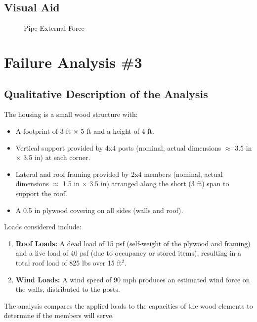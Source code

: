 \documentclass[12pt]{report}
\begin{document}
\subsection{Visual Aid}
\begin{figure}[!ht]
\centering
{}%

\label{fig:inpo_pipe}
\caption{Pipe External Force}
\end{figure}
\newpage
\section{Failure Analysis \#3}

\subsection{Qualitative Description of the Analysis}
The housing is a small wood structure with:
\begin{itemize}
    \item A footprint of 3 ft $\times$ 5 ft and a height of 4 ft.
    \item Vertical support provided by 4x4 posts (nominal, actual dimensions $\approx$ 3.5 in $\times$ 3.5 in) at each corner.
    \item Lateral and roof framing provided by 2x4 members (nominal, actual dimensions $\approx$ 1.5 in $\times$ 3.5 in) arranged along the short (3 ft) span to support the roof.
    \item A 0.5 in plywood covering on all sides (walls and roof).
\end{itemize}
Loads considered include:
\begin{enumerate}
    \item \textbf{Roof Loads:} A dead load of 15 psf (self-weight of the plywood and framing) and a live load of 40 psf (due to occupancy or stored items), resulting in a total roof load of 825 lbs over 15 ft\(^2\).
    \item \textbf{Wind Loads:} A wind speed of 90 mph produces an estimated wind force on the walls, distributed to the posts.
\end{enumerate}
The analysis compares the applied loads to the capacities of the wood elements to determine if the members will serve.
\end{document}

